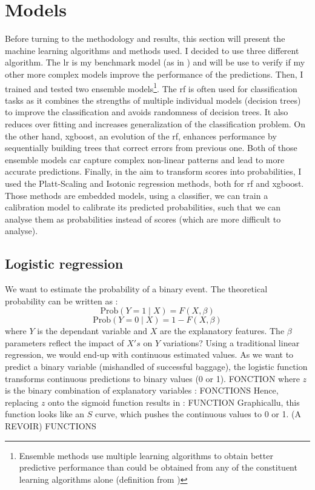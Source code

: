 \documentclass[12pt]{article}
\begin{document}
\newpage
\section{Models}
Before turning to the methodology and results, this section will present the machine learning algorithms and methods used.\hfill \break
\indent I decided to use three different algorithm.
The \acrlong{lr} is my benchmark model (as in \cite{MishandledBgas}) and will be use to verify if my other more complex models improve the performance of the predictions. 
Then, I trained and tested two ensemble models\footnote{Ensemble methods use multiple learning algorithms to obtain better predictive performance than could be obtained from any of the constituent learning algorithms alone (definition from \cite{wikiensemble})}. The \acrfull{rf} is often used for classification tasks as it combines the strengths of multiple individual models (decision trees) to improve the classification and avoids randomness of decision trees. It also reduces over fitting and increases generalization of the classification problem.
On the other hand, \acrfull{xgboost}, an evolution of the \acrshort{rf}, enhances performance by sequentially building trees that correct errors from previous one.
Both of those ensemble models car capture complex non-linear patterns and lead to more accurate predictions.
Finally, in the aim to transform scores into probabilities, I used the Platt-Scaling and Isotonic regression methods, both for \acrshort{rf} and \acrshort{xgboost}. Those methods are embedded models, using a classifier, we can train a calibration model to calibrate its predicted probabilities, such that we can analyse them as probabilities instead of scores (which are more difficult to analyse).

\subsection{Logistic regression}\label{subsec:Logistic regression}

We want to estimate the probability of a binary event. The theoretical probability can be written as : \hfill \break
\begin{equation}
\text{Prob}(Y=1 \mid X) = F(X, \beta)    
\end{equation}
\begin{equation}
\text{Prob}(Y=0 \mid X) = 1 - F(X, \beta)    
\end{equation}
where $Y$ is the dependant variable and $X$ are the explanatory features. The $\beta$ parameters reflect the impact of $X's$ on $Y$ variations? Using a traditional linear regression, we would end-up with continuous estimated values. As we want to predict a binary variable (mishandled of successful baggage), the logistic function transforms continuous predictions to binary values (0 or 1).\hfill \break
FONCTION\hfill \break
where $z$ is the binary combination of explanatory variables :\hfill \break
FONCTIONS\hfill \break
Hence, replacing $z$ onto the sigmoid function results in : \hfill \break
FUNCTION\hfill \break
Graphicallu, this function looks like an $S$ curve, which pushes the continuous values to 0 or 1. (A REVOIR)\hfill \break
FUNCTIONS\hfill \break
\end{document}
